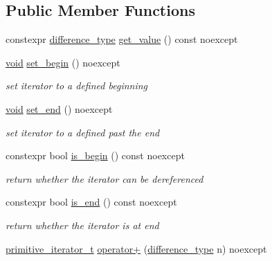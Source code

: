 \subsection*{Public Member Functions}
\begin{DoxyCompactItemize}
\item 
constexpr \hyperlink{classnlohmann_1_1detail_1_1primitive__iterator__t_af3db0d5c90de427d51645fe73a015553}{difference\+\_\+type} \hyperlink{classnlohmann_1_1detail_1_1primitive__iterator__t_ae952990886ca1756229f916661a8af81}{get\+\_\+value} () const noexcept
\item 
\hyperlink{namespacenlohmann_1_1detail_a59fca69799f6b9e366710cb9043aa77d}{void} \hyperlink{classnlohmann_1_1detail_1_1primitive__iterator__t_a9d9b005906106e12aed738f97d7fee42}{set\+\_\+begin} () noexcept
\begin{DoxyCompactList}\small\item\em set iterator to a defined beginning \end{DoxyCompactList}\item 
\hyperlink{namespacenlohmann_1_1detail_a59fca69799f6b9e366710cb9043aa77d}{void} \hyperlink{classnlohmann_1_1detail_1_1primitive__iterator__t_ad26a823483846a12d890c3feed3097eb}{set\+\_\+end} () noexcept
\begin{DoxyCompactList}\small\item\em set iterator to a defined past the end \end{DoxyCompactList}\item 
constexpr bool \hyperlink{classnlohmann_1_1detail_1_1primitive__iterator__t_a8d1a7d46b3fcd06edd034f04ededb5e4}{is\+\_\+begin} () const noexcept
\begin{DoxyCompactList}\small\item\em return whether the iterator can be dereferenced \end{DoxyCompactList}\item 
constexpr bool \hyperlink{classnlohmann_1_1detail_1_1primitive__iterator__t_a45a7e301c23b5b90417baf2277f40b1d}{is\+\_\+end} () const noexcept
\begin{DoxyCompactList}\small\item\em return whether the iterator is at end \end{DoxyCompactList}\item 
\hyperlink{classnlohmann_1_1detail_1_1primitive__iterator__t}{primitive\+\_\+iterator\+\_\+t} \hyperlink{classnlohmann_1_1detail_1_1primitive__iterator__t_a00ce828d0fe58046c10e0445504df7bf}{operator+} (\hyperlink{classnlohmann_1_1detail_1_1primitive__iterator__t_af3db0d5c90de427d51645fe73a015553}{difference\+\_\+type} n) noexcept

\end{DoxyCompactItemize}
